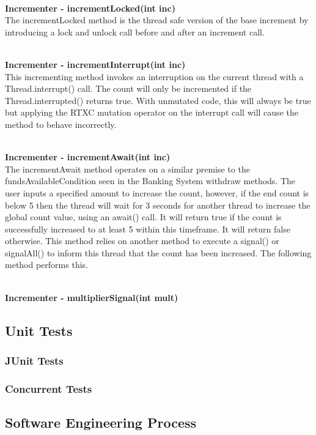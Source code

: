 \documentclass[a4paper,12pt]{article}
\begin{document}
\textbf{\\Incrementer - incrementLocked(int inc)}
\\The incrementLocked method is the thread safe version of the base increment by introducing a lock and unlock call before and after an increment call.  

\textbf{\\Incrementer - incrementInterrupt(int inc)}
\\This incrementing method invokes an interruption on the current thread with a Thread.interrupt() call. The count will only be incremented if the Thread.interrupted() returns true. With unmutated code, this will always be true but applying the RTXC mutation operator on the interrupt call will cause the method to behave incorrectly.    

\textbf{\\Incrementer - incrementAwait(int inc)}
\\The incrementAwait method operates on a similar premise to the fundsAvailableCondition seen in the Banking System withdraw methods. The user inputs a specified amount to increase the count, however, if the end count is below 5 then the thread will wait for 3 seconds for another thread to increase the global count value, using an await() call. It will return true if the count is successfully increased to at least 5 within this timeframe. It will return false otherwise. This method relies on another method to execute a signal() or signalAll() to inform this thread that the count has been increased. The following method performs this. 


\textbf{\\Incrementer - multiplierSignal(int mult)}
	    
	\subsection{Unit Tests} \label{section:Unit Tests}
	    \subsubsection{JUnit Tests}
	    \subsubsection{Concurrent Tests}
    \subsection{Software Engineering Process}
	
\end{document}
